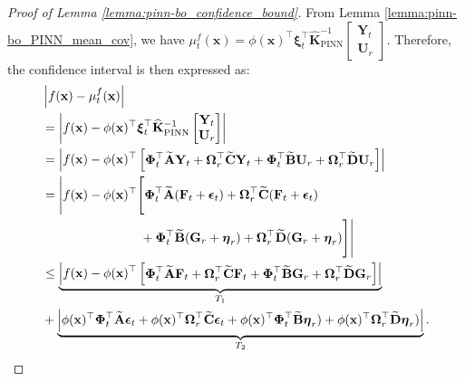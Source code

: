 \begin{proof}[Proof of Lemma \ref{lemma:pinn-bo_confidence_bound}]
From Lemma \ref{lemma:pinn-bo_PINN_mean_cov}, we have $\mu_t^f(\mathbf{x}) =\phi(\mathbf{x})^\top \boldsymbol{\xi}_t^\top \mathbf{\widehat{K}}_\mathrm{PINN}^{-1} \begin{bmatrix}
         \mathbf{Y}_t \\
         \mathbf{U}_r\end{bmatrix}$. Therefore, the confidence interval is then expressed as:
\begin{align*}
        & \left\lvert f(\mathbf{x}) - \mu_t^f(\mathbf{x}) \right\rvert 
        \\
        &= \left\lvert f(\mathbf{x}) - 
        \phi(\mathbf{x})^\top \boldsymbol{\xi}_t^\top \mathbf{\widehat{K}}_\mathrm{PINN}^{-1} \begin{bmatrix}
         \mathbf{Y}_t 
\\
         \mathbf{U}_r\end{bmatrix} \right \rvert
\\
        & = \left\lvert f(\mathbf{x}) - \phi(\mathbf{x})^\top \begin{bmatrix}
            \boldsymbol{\Phi}_t^\top \widetilde{\mathbf{A}}\mathbf{Y}_t + \boldsymbol{\Omega}_r^\top \widetilde{\mathbf{C}}\mathbf{Y}_t + \boldsymbol{\Phi}_t^\top \widetilde{\mathbf{B}}\mathbf{U}_r + \boldsymbol{\Omega}_r^\top \widetilde{\mathbf{D}}\mathbf{U}_r
        \end{bmatrix} \right\rvert 
\\
        & = \Bigg\lvert f(\mathbf{x}) - \phi(\mathbf{x})^\top \Bigg[
            \boldsymbol{\Phi}_t^\top \widetilde{\mathbf{A}}(\mathbf{F}_t + \boldsymbol{\epsilon}_t) + \boldsymbol{\Omega}_r^\top \widetilde{\mathbf{C}}(\mathbf{F}_t + \boldsymbol{\epsilon}_t) \notag \\
            &  \;\;\;\;\;\;\;\;\;\;\;\;\;\;\;\;\;\;\;\;\;\;\;\;\;\;\;\;+  \boldsymbol{\Phi}_t^\top \widetilde{\mathbf{B}}(\mathbf{G}_r +\boldsymbol{\eta}_r) + \boldsymbol{\Omega}_r^\top \widetilde{\mathbf{D}}(\mathbf{G}_r +\boldsymbol{\eta}_r)
        \Bigg] \Bigg\rvert 
\\
        & \le \underbrace{\left\lvert f(\mathbf{x}) - \phi(\mathbf{x})^\top \begin{bmatrix}
            \boldsymbol{\Phi}_t^\top \widetilde{\mathbf{A}}\mathbf{F}_t + \boldsymbol{\Omega}_r^\top \widetilde{\mathbf{C}}\mathbf{F}_t + \boldsymbol{\Phi}_t^\top \widetilde{\mathbf{B}}\mathbf{G}_r+ \boldsymbol{\Omega}_r^\top \widetilde{\mathbf{D}}\mathbf{G}_r
        \end{bmatrix} \right\rvert}_{T_1} 
\\ 
        & + \underbrace{\left\lvert \phi(\mathbf{x})^\top \boldsymbol{\Phi}_t^\top \widetilde{\mathbf{A}}\boldsymbol{\epsilon}_t +  \phi(\mathbf{x})^\top \boldsymbol{\Omega}_r^\top \widetilde{\mathbf{C}}\boldsymbol{\epsilon}_t +  \phi(\mathbf{x})^\top \boldsymbol{\Phi}_t^\top \widetilde{\mathbf{B}}\boldsymbol{\eta}_r) + \phi(\mathbf{x})^\top \boldsymbol{\Omega}_r^\top \widetilde{\mathbf{D}}\boldsymbol{\eta}_r)\right\rvert}_{T_2}.
    \end{align*}
    

\end{proof}
